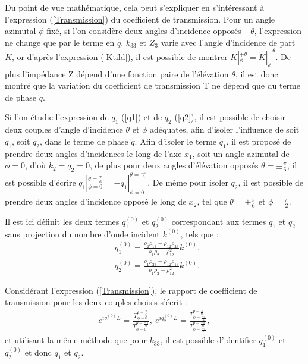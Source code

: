 \documentclass[12pt]{report}
\begin{document}
    Du point de vue mathématique, cela peut s'expliquer en s'intéressant à l'expression (\ref{Transmission}) du coefficient de transmission. Pour un angle azimutal $\phi$ fixé, si l'on considère deux angles d'incidence opposés $\pm \theta$, l'expression ne change que par le terme en $\tilde{q}$. $k_{33}$ et $Z_3$ varie avec l'angle d'incidence de part $\tilde{K}$, or d'après l'expression (\ref{Ktild}), il est possible de montrer $\tilde{K}|^{+\theta}_{\phi}=\tilde{K}|^{-\theta}_{\phi}$. De plus l'impédance Z dépend d'une fonction paire de l'élévation $\theta$, il est donc montré que la variation du coefficient de transmission T ne dépend que du terme de phase $\tilde{q}$.
    
    Si l'on étudie l'expression de $q_1$ (\ref{q1}) et de $q_2$ (\ref{q2}), il est possible de choisir deux couples d'angle d'incidence $\theta$ et $\phi$ adéquates, afin d'isoler l'influence de soit $q_1$, soit $q_2$, dans le terme de phase $\tilde{q}$. Afin d'isoler le terme $q_1$, il est proposé de prendre deux angles d'incidences le long de l'axe $x_1$, soit un angle azimutal de $\phi=0$, d'où $k_2=q_2=0$, de plus pour deux angles d'élévation opposés $\theta=\pm \frac{\pi}{6}$, il est possible d'écrire $q_1|^{\theta=\frac{\pi}{6}}_{\phi=0}=-q_1|^{\theta=\frac{-\pi}{6}}_{\phi=0}$. De même pour isoler $q_2$, il est possible de prendre deux angles d'incidence opposé le long de $x_2$, tel que $\theta=\pm \frac{\pi}{6}$ et $\phi=\frac{\pi}{2}$.
    
    Il est ici définit les deux termes $q_1^{(0)}$ et $q_2^{(0)}$ correspondant aux termes $q_1$ et $q_2$ sans projection du nombre d'onde incident $k^{(0)}$, tels que :
    \begin{align}
            &q_1^{(0)}=\frac{\rho_2\rho_{13}-\rho_{12}\rho_{23}}{\rho_1\rho_2-\rho_{12}^2}k^{(0)},\label{q1,0}\\
        &q_2^{(0)}=\frac{\rho_1\rho_{23}-\rho_{12}\rho_{13}}{\rho_1\rho_2-\rho_{12}^2}k^{(0)}.\label{q2,0}
    \end{align}
    
    Considérant l'expression (\ref{Transmission}), le rapport de coefficient de transmission pour les deux couples choisis s'écrit :
    \begin{align}
     e^{iq_1^{(0)}L}=\frac{T^{\theta=\frac{\pi}{6}}_{\phi=0}}{T^{\theta=\frac{-\pi}{6}}_{\phi=0}},\ e^{iq_2^{(0)}L}=\frac{T^{\theta=\frac{\pi}{6}}_{\phi=\frac{-\pi}{2}}}{T^{\theta=\frac{-\pi}{6}}_{\phi=\frac{-\pi}{2}}},
    \end{align}
    et utilisant la même méthode que pour $k_{33}$, il est possible d'identifier $q_1^{(0)}$ et $q_2^{(0)}$ et donc $q_1$ et $q_2$.
    
\end{document}
